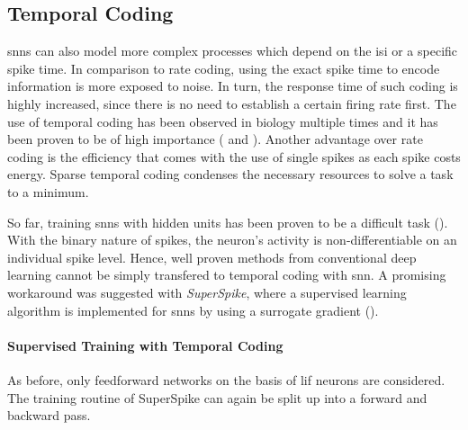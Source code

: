 \pagebreak
\subsection{Temporal Coding}
\label{temporalcoding}
\glspl{snn} can also model more complex processes which depend on the \gls{isi} or a specific spike time. In comparison to rate coding, using the exact spike time to encode information is more exposed to noise. In turn, the response time of such coding is highly increased, since there is no need to establish a certain firing rate first. The use of temporal coding has been observed in biology multiple times and it has been proven to be of high importance (\citealp{gerstner1996neuronal} and \citealp{rieke1999spikes}). Another advantage over rate coding is the efficiency that comes with the use of single spikes as each spike costs energy. Sparse temporal coding condenses the necessary resources to solve a task to a minimum.

So far, training \glspl{snn} with hidden units has been proven to be a difficult task (\citealp{pfeiffer2018deep}). With the binary nature of spikes, the neuron's activity is non-differentiable on an individual spike level. Hence, well proven methods from conventional deep learning cannot be simply transfered to temporal coding with \gls{snn}. A promising workaround was suggested with \emph{SuperSpike}, where a supervised learning algorithm is implemented for \glspl{snn} by using a surrogate gradient (\citealp{zenke2018superspike}).

\paragraph{Supervised Training with Temporal Coding}

As before, only feedforward networks on the basis of \gls{lif} neurons are considered. The training routine of SuperSpike can again be split up into a forward and backward pass.

